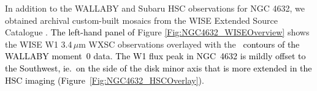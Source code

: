 \documentclass[fleqn,usenatbib]{mnras}
\newcommand{\hi}{\text{H\,\sc{i}}}
\begin{document}

 


In addition to the WALLABY and Subaru HSC observations for NGC 4632, we obtained archival custom-built mosaics from the WISE Extended Source Catalogue \citep[WXSC;][]{jarrett+2013,jarrett+2019}.  \textcolor{black}{The left-hand panel of}
Figure \ref{Fig:NGC4632_WISEOverview} shows the WISE W1 3.4\,$\mu$m WXSC observations overlayed with the \textcolor{black}{\hi\ contours of the WALLABY moment~0 data}. \textcolor{black}{The W1 flux peak in NGC~4632 is mildly offset to the Southwest, ie.\ on the side of the disk minor axis that is more extended in the HSC imaging (Figure~\ref{Fig:NGC4632_HSCOverlay})}.
\end{document}
